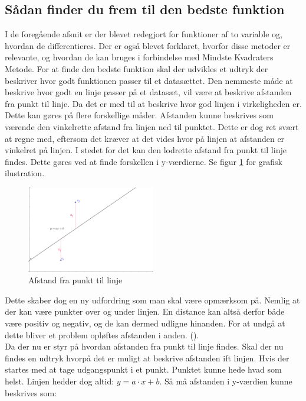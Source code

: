 \subsection{Sådan finder du frem til den bedste funktion}\label{sec:bedsteFunktion}
I de foregående afsnit er der blevet redegjort for funktioner af to variable og, hvordan de differentieres. Der er også blevet forklaret, hvorfor disse metoder er relevante, og hvordan de kan bruges i forbindelse med Mindste Kvadraters Metode. For at finde den bedste funktion skal der udvikles et udtryk der beskriver hvor godt funktionen passer til et datasættet. Den nemmeste måde at beskrive hvor godt en linje passer på et datasæt, vil være at beskrive afstanden fra punkt til linje. Da det er med til at beskrive hvor god linjen i virkeligheden er. Dette kan gøres på flere forskellige måder. Afstanden kunne beskrives som værende den vinkelrette afstand fra linjen ned til punktet. Dette er dog ret svært at regne med, eftersom det kræver at det vides hvor på linjen at afstanden er vinkelret på linjen. I stedet for det kan den lodrette afstand fra punkt til linje findes. Dette gøres ved at finde forskellen i y-værdierne. Se figur \ref{fig:afstandFraLinjeTilPunkt} for grafisk ilustration.
\begin{figure}
    \centering
    \includegraphics[width=0.5\textwidth]{figures/afstand.png}
    \caption{Afstand fra punkt til linje}
    \label{fig:afstandFraLinjeTilPunkt}
\end{figure}   
Dette skaber dog en ny udfordring som man skal være opmærksom på. Nemlig at der kan være punkter over og under linjen. En distance kan altså derfor både være positiv og negativ, og de kan dermed udligne hinanden. For at undgå at dette bliver et problem opløftes afstanden i anden. (\cite[2]{ForberedelsessetMaj2013}). \\ Da der nu er styr på hvordan afstanden fra punkt til linje findes. Skal der nu findes en udtryk hvorpå det er muligt at beskrive afstanden ift linjen. Hvis der startes med at tage udgangspunkt i et punkt. Punktet kunne hede hvad som helst. Linjen hedder dog altid: $y = a \cdot x + b$. Så må afstanden i y-værdien kunne beskrives som:  

